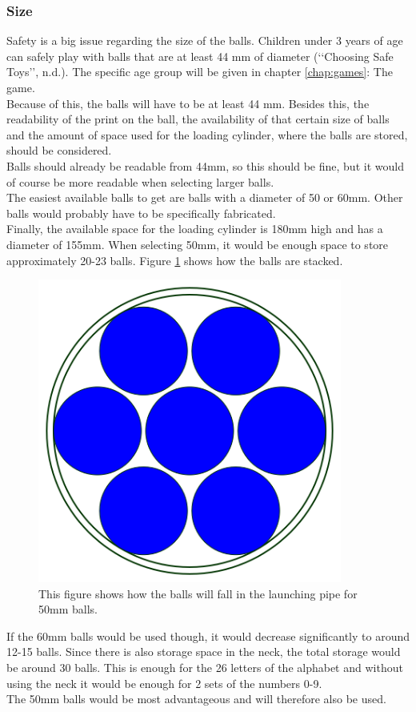 \documentclass[11pt,twoside,a4paper]{report}
\begin{document}
\subsubsection{Size}
Safety is a big issue regarding the size of the balls. Children under 3 years of age can safely play with balls that are at least 44 mm of diameter (\lq\lq{}Choosing Safe Toys\rq\rq{}, n.d.). The specific age group will be given in chapter \ref{chap:games}: The game. \\
Because of this, the balls will have to be at least 44 mm. Besides this, the readability of the print on the ball, the availability of that certain size of balls and the amount of space used for the loading cylinder, where the balls are stored, should be considered. \\
Balls should already be readable from 44mm, so this should be fine, but it would of course be more readable when selecting larger balls. \\
The easiest available balls to get are balls with a diameter of 50 or 60mm. Other balls would probably have to be specifically fabricated. \\
Finally, the available space for the loading cylinder is 180mm high and has a diameter of 155mm. When selecting 50mm, it would be enough space to store approximately 20-23 balls. Figure \ref{fig:balllaunch} shows how the balls are stacked. \\
\begin{figure}[H]
\begin{center}
\includegraphics[width = 10cm]{Images/BallLaunch.png}
\caption{This figure shows how the balls will fall in the launching pipe for 50mm balls.}
\label{fig:balllaunch}
\end{center}
\end{figure}
If the 60mm balls would be used though, it would decrease significantly to around 12-15 balls. 
Since there is also storage space in the neck, the total storage would be around 30 balls. This is enough for the 26 letters of the alphabet and without using the neck it would be enough for 2 sets of the numbers 0-9. \\
The 50mm balls would be most advantageous and will therefore also be used. 
\end{document}
